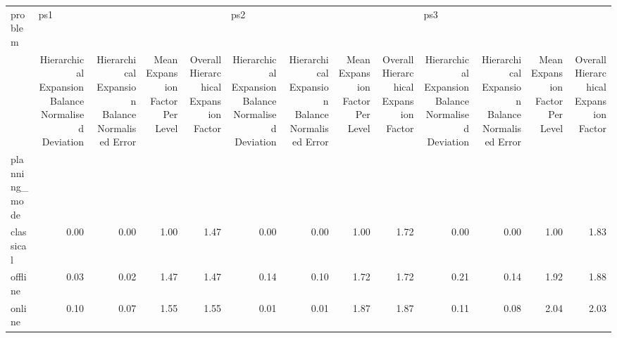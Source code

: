 \begin{tabular}{lrrrrrrrrrrrr}
\toprule
problem & \multicolumn{4}{l}{ps1} & \multicolumn{4}{l}{ps2} & \multicolumn{4}{l}{ps3} \\
{} & Hierarchical Expansion Balance Normalised Deviation & Hierarchical Expansion Balance Normalised Error & Mean Expansion Factor Per Level & Overall Hierarchical Expansion Factor & Hierarchical Expansion Balance Normalised Deviation & Hierarchical Expansion Balance Normalised Error & Mean Expansion Factor Per Level & Overall Hierarchical Expansion Factor & Hierarchical Expansion Balance Normalised Deviation & Hierarchical Expansion Balance Normalised Error & Mean Expansion Factor Per Level & Overall Hierarchical Expansion Factor \\
planning\_mode &                                                     &                                                 &                                 &                                       &                                                     &                                                 &                                 &                                       &                                                     &                                                 &                                 &                                       \\
\midrule
classical     &                                               0.00 &                                            0.00 &                            1.00 &                                  1.47 &                                               0.00 &                                            0.00 &                            1.00 &                                  1.72 &                                               0.00 &                                            0.00 &                            1.00 &                                  1.83 \\
offline       &                                               0.03 &                                            0.02 &                            1.47 &                                  1.47 &                                               0.14 &                                            0.10 &                            1.72 &                                  1.72 &                                               0.21 &                                            0.14 &                            1.92 &                                  1.88 \\
online        &                                               0.10 &                                            0.07 &                            1.55 &                                  1.55 &                                               0.01 &                                            0.01 &                            1.87 &                                  1.87 &                                               0.11 &                                            0.08 &                            2.04 &                                  2.03 \\
\bottomrule
\end{tabular}
